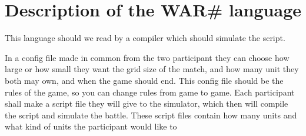
\section{ Description of the WAR\# language }

This language should we read by a compiler which should simulate the script.


In a config file made in common from the two participant they can choose how large or how small they want the grid size of the match, and how many unit they both may own, and when the game should end. This config file should be the rules of the game, so you can change rules from game to game.
Each participant shall make a script file they will give to the simulator, which then will compile the script and simulate the battle. These script files contain how many units and what kind of units the participant would like to 